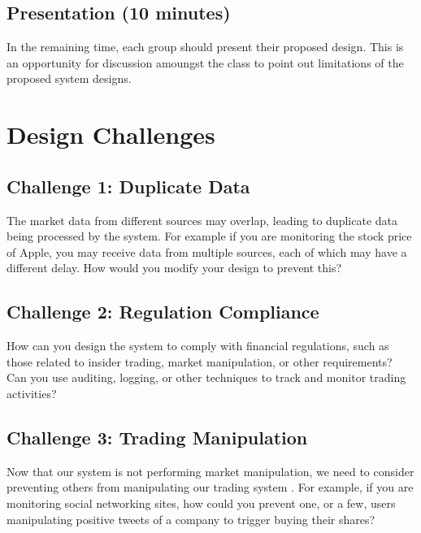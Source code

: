\documentclass{csse4400}
\begin{document}
\subsection*{Presentation (10 minutes)}

In the remaining time,
each group should present their proposed design.
This is an opportunity for discussion amoungst the class to point out limitations of the proposed system designs.

\section{Design Challenges}

\subsection*{Challenge 1: Duplicate Data}
The market data from different sources may overlap,
leading to duplicate data being processed by the system.
For example if you are monitoring the stock price of Apple,
you may receive data from multiple sources,
each of which may have a different delay.
How would you modify your design to prevent this?

\subsection*{Challenge 2: Regulation Compliance}
How can you design the system to comply with financial regulations,
such as those related to insider trading, market manipulation, or other requirements?
Can you use auditing, logging, or other techniques to track and monitor trading activities?

\subsection*{Challenge 3: Trading Manipulation}
Now that our system is not performing market manipulation,
we need to consider preventing others from manipulating our trading system \cite{bot-manipulation}.
For example,
if you are monitoring social networking sites,
how could you prevent one, or a few, users manipulating positive tweets of a company to trigger buying their shares?



\end{document}
